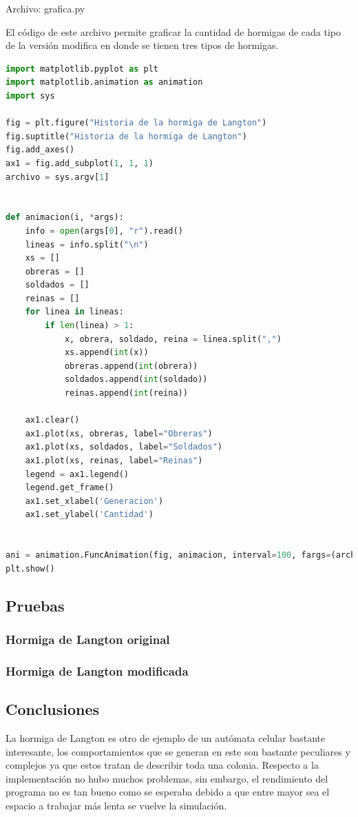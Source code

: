 Archivo: grafica.py

El código de este archivo permite graficar la cantidad de hormigas de cada tipo de la versión modifica en donde se tienen tres tipos de hormigas.
\begin{lstlisting}[language=Python]
import matplotlib.pyplot as plt
import matplotlib.animation as animation
import sys

fig = plt.figure("Historia de la hormiga de Langton")
fig.suptitle("Historia de la hormiga de Langton")
fig.add_axes()
ax1 = fig.add_subplot(1, 1, 1)
archivo = sys.argv[1]


def animacion(i, *args):
    info = open(args[0], "r").read()
    lineas = info.split("\n")
    xs = []
    obreras = []
    soldados = []
    reinas = []
    for linea in lineas:
        if len(linea) > 1:
            x, obrera, soldado, reina = linea.split(",")
            xs.append(int(x))
            obreras.append(int(obrera))
            soldados.append(int(soldado))
            reinas.append(int(reina))

    ax1.clear()
    ax1.plot(xs, obreras, label="Obreras")
    ax1.plot(xs, soldados, label="Soldados")
    ax1.plot(xs, reinas, label="Reinas")
    legend = ax1.legend()
    legend.get_frame()
    ax1.set_xlabel('Generacion')
    ax1.set_ylabel('Cantidad')


ani = animation.FuncAnimation(fig, animacion, interval=100, fargs=(archivo,))
plt.show()
\end{lstlisting}

\subsection{Pruebas}
\subsubsection{Hormiga de Langton original}
\subsubsection{Hormiga de Langton modificada}
\subsection{Conclusiones}
La hormiga de Langton es otro de ejemplo de un autómata celular bastante interesante, los comportamientos que se generan en este son bastante peculiares y complejos ya que estos tratan de describir toda una colonia. Respecto a la implementación no hubo muchos problemas, sin embargo, el rendimiento del programa no es tan bueno como se esperaba debido a que entre mayor sea el espacio a trabajar más lenta se vuelve la simulación.

